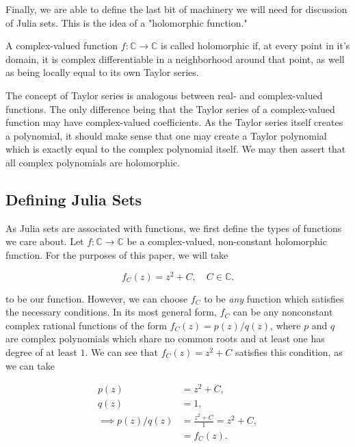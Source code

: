 \documentclass[12pt]{article}
\def\CC{{\mathbb C}}
\begin{document}
Finally, we are able to define the last bit of machinery we will need for discussion of Julia sets. This is the idea of a "holomorphic function."

\begin{defin}
A complex-valued function $f:\CC\to\CC$ is called holomorphic if, at every point in it's domain, it is complex differentiable in a neighborhood around that point, as well as being locally equal to its own Taylor series. 
\end{defin}
 
The concept of Taylor series is analogous between real- and complex-valued functions. The only difference being that the Taylor series of a complex-valued function may have complex-valued coefficients. As the Taylor series itself creates a polynomial, it should make sense that one may create a Taylor polynomial which is exactly equal to the complex polynomial itself. We may then assert that all complex polynomials are holomorphic. 



\subsection{Defining Julia Sets}

As Julia sets are associated with functions, we first define the types of functions we care about. Let $f :\CC\to\CC$ be a complex-valued, non-constant holomorphic function. For the purposes of this paper, we will take 

\begin{equation}
f_C(z) = z^2 + C, \quad C \in \CC.
\end{equation}

to be our function. However, we can choose $f_C$ to be \textit{any} function which satisfies the necessary conditions. In its most general form, $f_C$ can be any nonconstant complex rational functions of the form $f_C(z) = p(z)/q(z)$, where $p$ and $q$ are complex polynomials which share no common roots and at least one has degree of at least $1$. We can see that $f_C(z) = z^2 + C$ satisfies this condition, as we can take

\begin{align*}
p(z) &= z^2 + C, \\
q(z) &= 1, \\
\implies p(z)/q(z) &= \frac{z^2 + C}{1} = z^2 + C, \\
&= f_C(z).
\end{align*}
\end{document}
